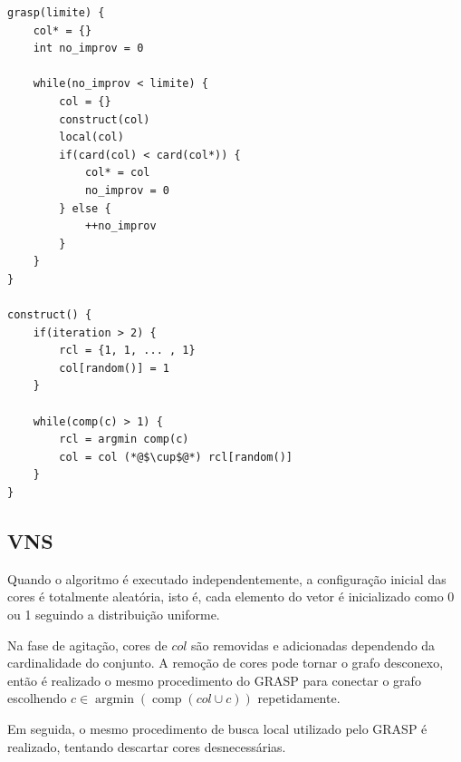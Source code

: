 \documentclass[12pt, a4paper]{article}
\DeclareMathOperator{\argmin}{argmin}
\DeclareMathOperator{\comp}{comp}
\begin{document}
%

\begin{lstlisting}[caption=Pseudocódigo para GRASP, basicstyle=\ttfamily\scriptsize]
grasp(limite) {
    col* = {}
    int no_improv = 0

    while(no_improv < limite) {
        col = {}
        construct(col)
        local(col)
        if(card(col) < card(col*)) {
            col* = col
            no_improv = 0
        } else {
            ++no_improv
        }
    }
}

construct() {
    if(iteration > 2) {
        rcl = {1, 1, ... , 1}
        col[random()] = 1
    }

    while(comp(c) > 1) {
        rcl = argmin comp(c)
        col = col (*@$\cup$@*) rcl[random()]
    }
}
\end{lstlisting}

\subsection{VNS}
Quando o algoritmo é executado independentemente, a configuração inicial das
cores é totalmente aleatória, isto é, cada elemento do vetor é inicializado
como 0 ou 1 seguindo a distribuição uniforme.

Na fase de agitação, cores de $ col $ são removidas e adicionadas dependendo da
cardinalidade do conjunto. A remoção de cores pode tornar o grafo desconexo,
então é realizado o mesmo procedimento do GRASP para conectar o grafo
escolhendo $ c \in \argmin(\comp(col \cup c)) $ repetidamente.

Em seguida, o mesmo procedimento de busca local utilizado pelo GRASP é
realizado, tentando descartar cores desnecessárias.
\end{document}
